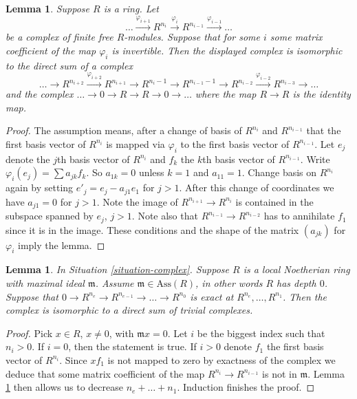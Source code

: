 \documentclass{amsart}
\theoremstyle{plain}
\newtheorem{lemma}[subsection]{Lemma}
\theoremstyle{definition}
\theoremstyle{remark}
\numberwithin{equation}{subsection}
\begin{document}
\begin{lemma}
\label{lemma-add-trivial-complex}
Suppose $R$ is a ring. Let
$$
\ldots
\xrightarrow{\varphi_{i + 1}}
R^{n_i}
\xrightarrow{\varphi_i}
R^{n_{i-1}}
\xrightarrow{\varphi_{i-1}}
\ldots
$$
be a complex of finite free $R$-modules. Suppose that for some $i$
some matrix coefficient of the map $\varphi_i$ is invertible.
Then the displayed complex is isomorphic to the direct sum of a complex
$$
\ldots \to
R^{n_{i + 2}} \xrightarrow{\varphi_{i + 2}}
R^{n_{i + 1}} \to
R^{n_i - 1} \to
R^{n_{i - 1} - 1} \to
R^{n_{i - 2}} \xrightarrow{\varphi_{i - 2}}
R^{n_{i - 3}} \to
\ldots
$$
and the complex $\ldots \to 0 \to R \to R \to 0 \to \ldots$
where the map $R \to R$ is the identity map.
\end{lemma}

\begin{proof}
The assumption means, after a change of basis of
$R^{n_i}$ and $R^{n_{i-1}}$ that the first basis
vector of $R^{n_i}$ is mapped via $\varphi_i$ to the first basis
vector of $R^{n_{i-1}}$. Let $e_j$ denote the
$j$th basis vector of $R^{n_i}$ and $f_k$ the $k$th
basis vector of $R^{n_{i-1}}$. Write $\varphi_i(e_j)
= \sum a_{jk} f_k$. So $a_{1k} = 0$ unless $k = 1$
and $a_{11} = 1$. Change basis on $R^{n_i}$ again
by setting $e'_j = e_j - a_{j1} e_1$ for $j > 1$.
After this change of coordinates we have $a_{j1} = 0$
for $j > 1$. Note the image
of $R^{n_{i + 1}} \to R^{n_i}$ is contained in the
subspace spanned by $e_j$, $j > 1$. Note also
that $R^{n_{i-1}} \to R^{n_{i-2}}$ has to annihilate
$f_1$ since it is in the image. These conditions
and the shape of the matrix $(a_{jk})$ for $\varphi_i$
imply the lemma.
\end{proof}


\begin{lemma}
\label{lemma-exact-depth-zero-local}
In Situation \ref{situation-complex}. Suppose $R$ is
a local Noetherian ring with maximal ideal $\mathfrak m$.
Assume $\mathfrak m \in \text{Ass}(R)$, in other words
$R$ has depth $0$. Suppose that
$0 \to R^{n_e} \to R^{n_{e-1}} \to \ldots \to R^{n_0}$
is exact at $R^{n_e}, \ldots, R^{n_1}$.
Then the complex is isomorphic to a direct sum of trivial
complexes.
\end{lemma}

\begin{proof}
Pick $x \in R$, $x \not = 0$, with $\mathfrak m x = 0$.
Let $i$ be the biggest index such that $n_i > 0$.
If $i = 0$, then the statement is true. If
$i > 0$ denote $f_1$ the first basis vector of $R^{n_i}$.
Since $xf_1$ is not mapped to zero by
exactness of the complex we deduce that some matrix
coefficient of the map $R^{n_i} \to R^{n_{i - 1}}$
is not in $\mathfrak m$.
Lemma \ref{lemma-add-trivial-complex} then allows
us to decrease $n_e + \ldots + n_1$. Induction finishes the proof.
\end{proof}
\end{document}
